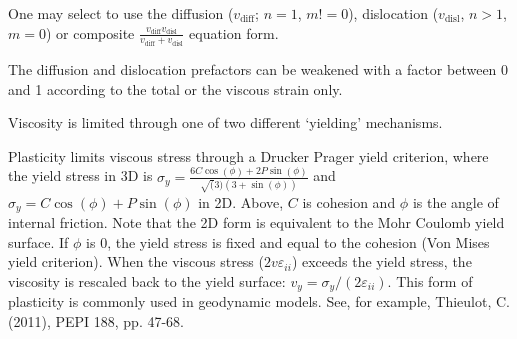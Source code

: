 \begin{itemize}
 One may select to use the diffusion ($v_{\text{diff}}$; $n=1$, $m!=0$), dislocation ($v_{\text{disl}}$, $n>1$, $m=0$) or composite $\frac{v_{\text{diff}} v_{\text{disl}}}{v_{\text{diff}}+v_{\text{disl}}}$ equation form. 

 The diffusion and dislocation prefactors can be weakened with a factor between 0 and 1 according to the total or the viscous strain only. 

 Viscosity is limited through one of two different `yielding' mechanisms. 

Plasticity limits viscous stress through a Drucker Prager yield criterion, where the yield stress in 3D is  $\sigma_y = \frac{6C\cos(\phi) + 2P\sin(\phi)} {\sqrt(3)(3+\sin(\phi))}$ and $\sigma_y = C\cos(\phi) + P\sin(\phi)$ in 2D. Above, $C$ is cohesion and $\phi$  is the angle of internal friction.  Note that the 2D form is equivalent to the Mohr Coulomb yield surface.  If $\phi$ is 0, the yield stress is fixed and equal to the cohesion (Von Mises yield criterion). When the viscous stress ($2v{\varepsilon}_{ii}$) exceeds the yield stress, the viscosity is rescaled back to the yield surface: $v_{y}=\sigma_{y}/(2{\varepsilon}_{ii})$. This form of plasticity is commonly used in geodynamic models. See, for example, Thieulot, C. (2011), PEPI 188, pp. 47-68. 


\end{itemize}
